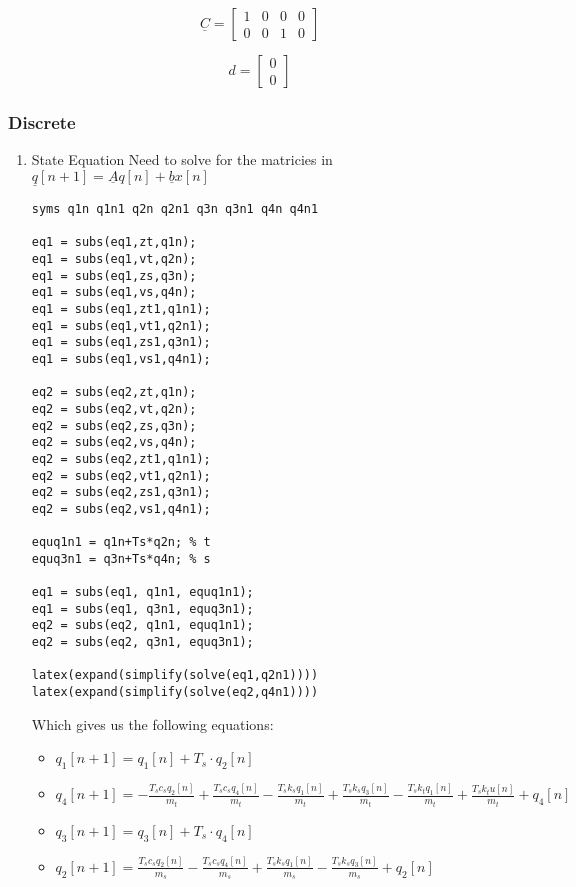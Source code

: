 \documentclass[11pt]{article}
\begin{document}
\begin{enumerate}
\[\underline{C} = \begin{bmatrix}
1 & 0 & 0 & 0 \\
0 & 0 & 1 & 0
\end{bmatrix}\]

\[d = \begin{bmatrix}
0 \\
0
\end{bmatrix}\]
\end{enumerate}
\subsubsection{Discrete}
\label{sec:org74bfe64}
\begin{enumerate}
\item State Equation
\label{sec:orga8e43fc}
Need to solve for the matricies in \(\underline{q}[n+1]=\underline{A}q[n]+\underline{b}x[n]\)
\begin{verbatim}
syms q1n q1n1 q2n q2n1 q3n q3n1 q4n q4n1

eq1 = subs(eq1,zt,q1n);
eq1 = subs(eq1,vt,q2n);
eq1 = subs(eq1,zs,q3n);
eq1 = subs(eq1,vs,q4n);
eq1 = subs(eq1,zt1,q1n1);
eq1 = subs(eq1,vt1,q2n1);
eq1 = subs(eq1,zs1,q3n1);
eq1 = subs(eq1,vs1,q4n1);

eq2 = subs(eq2,zt,q1n);
eq2 = subs(eq2,vt,q2n);
eq2 = subs(eq2,zs,q3n);
eq2 = subs(eq2,vs,q4n);
eq2 = subs(eq2,zt1,q1n1);
eq2 = subs(eq2,vt1,q2n1);
eq2 = subs(eq2,zs1,q3n1);
eq2 = subs(eq2,vs1,q4n1);

equq1n1 = q1n+Ts*q2n; % t
equq3n1 = q3n+Ts*q4n; % s

eq1 = subs(eq1, q1n1, equq1n1);
eq1 = subs(eq1, q3n1, equq3n1);
eq2 = subs(eq2, q1n1, equq1n1);
eq2 = subs(eq2, q3n1, equq3n1);

latex(expand(simplify(solve(eq1,q2n1))))
latex(expand(simplify(solve(eq2,q4n1))))

\end{verbatim}



Which gives us the following equations:
\begin{itemize}
\item \(q_1[n+1]=q_1[n]+T_s\cdot q_2[n]\)
\item \(q_4[n+1]=-\frac{T_s c_s q_2[n]}{m_t} + \frac{T_s c_s q_4[n]}{m_t} - \frac{T_s k_s q_1[n]}{m_t} + \frac{T_s k_s q_3[n]}{m_t} - \frac{T_s k_t q_1[n]}{m_t} + \frac{T_s k_t u[n]}{m_t} + q_4[n]\)
\item \(q_3[n+1]=q_3[n]+T_s\cdot q_4[n]\)
\item \(q_2[n+1]=\frac{T_s c_s q_2[n]}{m_s} - \frac{T_s c_s q_4[n]}{m_s} + \frac{T_s k_s q_1[n]}{m_s} - \frac{T_s k_s q_3[n]}{m_s} + q_2[n]\)
\end{itemize}



\end{enumerate}
\end{document}
